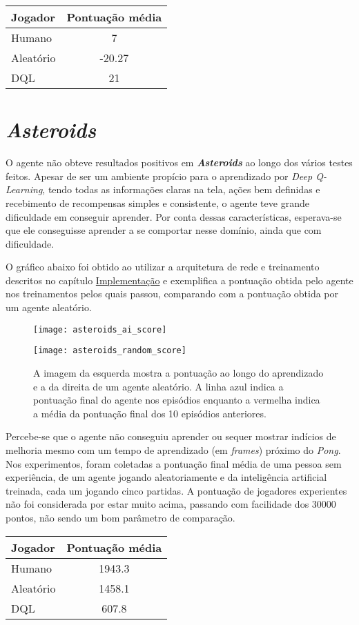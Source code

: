 \begin{center}
\begin{tabular}{l c}
\hline
Jogador & Pontuação média \\
\hline
Humano & 7 \\
Aleatório & -20.27 \\
DQL & 21 \\
\hline
\end{tabular}
\label{table:pong_score}
\end{center}

\section{\textit{Asteroids}}
\label{sec:res_asteroids}
O agente não obteve resultados positivos em \textbf{\textit{Asteroids}} ao longo dos vários testes feitos.
Apesar de ser um ambiente propício para o aprendizado por \textit{Deep Q-Learning}, tendo todas as informações claras na tela, ações bem definidas e recebimento de recompensas simples e consistente, o agente teve grande dificuldade em conseguir aprender.
Por conta dessas características, esperava-se que ele conseguisse aprender a se comportar nesse domínio, ainda que com dificuldade.

O gráfico abaixo foi obtido ao utilizar a arquitetura de rede e treinamento descritos no capítulo \hyperref[cap:implementacao]{Implementação} e exemplifica a pontuação obtida pelo agente nos treinamentos pelos quais passou, comparando com a pontuação obtida por um agente aleatório.

\begin{figure}[h!]
  \begin{minipage}[b]{.5\textwidth}
  \centering
  \texttt{[image: asteroids\_ai\_score]}
  \end{minipage}
  \hfill
  \begin{minipage}[b]{.5\textwidth}
  \centering
  \texttt{[image: asteroids\_random\_score]}
  \end{minipage}
  \caption{A imagem da esquerda mostra a pontuação ao longo do aprendizado e a da direita de um agente aleatório. A linha azul indica a pontuação final do agente nos episódios enquanto a vermelha indica a média da pontuação final dos 10 episódios anteriores.}
  \label{fig:asteroids_score}
\end{figure}

Percebe-se que o agente não conseguiu aprender ou sequer mostrar indícios de melhoria mesmo com um tempo de aprendizado (em \textit{frames}) próximo do \textit{Pong}.
Nos experimentos, foram coletadas a pontuação final média de uma pessoa sem experiência, de um agente jogando aleatoriamente e da inteligência artificial treinada, cada um jogando cinco partidas.
A pontuação de jogadores experientes não foi considerada por estar muito acima, passando com facilidade dos 30000 pontos, não sendo um bom parâmetro de comparação.

\begin{center}
\begin{tabular}{l c}
\hline
Jogador & Pontuação média \\
\hline
Humano & 1943.3 \\
Aleatório & 1458.1 \\
DQL & 607.8 \\
\hline
\end{tabular}
\label{table:asteroids_score}
\end{center}

